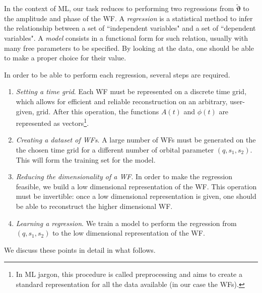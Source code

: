 In the context of ML, our task reduces to performing two regressions from $\tilde{\boldsymbol{\vartheta}}$ to the amplitude and phase of the WF. 
A {\it regression} is a statistical method to infer the relationship between a set of ``independent variables" and a set of ``dependent variables". A {\it model} consists in a functional form for such relation, usually with many free parameters to be specified. By looking at the data, one should be able to make a proper choice for their value.

In order to be able to perform each regression, several steps are required.

\begin{enumerate}[label=(\Alph*)]
	\item \textit{Setting a time grid}. Each WF must be represented on a discrete time grid, which allows for efficient and reliable reconstruction on an arbitrary, user-given, grid. After this operation, the functions $A(t)$ and $\phi(t)$ are represented as vectors\footnote{
In ML jargon, this procedure is called preprocessing and aims to create a standard representation for all the data available (in our case the WFs).
}.
	\item \textit{Creating a dataset of WFs}. A large number of WFs must be generated on the the chosen time grid for a different number of orbital parameter $(q,s_1,s_2)$. This will form the training set for the model.
	\item \textit{Reducing the dimensionality of a WF}. In order to make the regression feasible, we build a low dimensional representation of the WF. This operation must be invertible: once a low dimensional representation is given, one should be able to reconstruct the higher dimensional WF.
	\item \textit{Learning a regression}. We train a model to perform the regression from $(q, s_1, s_2)$ to the low dimensional representation of the WF.
\end{enumerate}
We discuss these points in detail in what follows.

%

